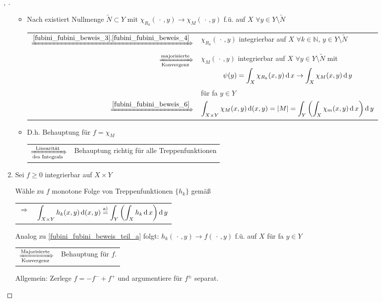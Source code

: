 \begin{proof}[, ]
\begin{enumerate}[label={\alph*)},topsep=\dimexpr-\baselineskip/2\relax]
\begin{itemize}
		\item Nach  existiert Nullmenge $\tilde{N}\subset Y$ mit $\chi_{R_k}(\,\cdot\, , y)\to \chi_M(\,\cdot \, , y)$ f.ü. auf $X$ $\forall y\in Y\setminus\tilde{N}$ \\
		\begin{tabularx}{\linewidth}{r@{\ \ }X}
		$\xRightarrow{\eqref{fubini_fubini_beweis_3},\eqref{fubini_fubini_beweis_4}}$ & $\chi_{R_k} (\,\cdot\, , y)$ integrierbar auf $X$ $\forall k\in \mathbb{N}$, $y\in Y\setminus\tilde{N}$ \\
		$\xRightarrow[\text{Konvergenz}]{\text{majorisierte}}$ & $\chi_M(\,\cdot\, ,y)$ integrierbar auf $X$ $\forall y\in Y\setminus\tilde{N}$ mit
		\[\psi(y) = \int_X \chi_{R_k}(x,y)\operatorname{d} x \to \int_X \chi_M (x,y) \operatorname{d} y\] für \gls{fa} $y\in Y$ \\
		$\xRightarrow{\eqref{fubini_fubini_beweis_6}}$&  $\displaystyle \int_{X\times Y} \chi_M (x,y) \operatorname{d} (x,y) = \vert M \vert = \int_Y \left( \int_X \chi_m (x,y) \operatorname{d} x\right) \operatorname{d} y$
		\end{tabularx}
		
		\item D.h. Behauptung für $f=\chi_M$ \\ \begin{tabularx}{\linewidth}{r@{\ \ }X}
		$\xRightarrow[\text{des Integrals}]{\text{Linearität}}$ & Behauptung richtig für alle Treppenfunktionen
		\end{tabularx}
		\end{itemize}
		\item Sei $f\ge 0$ integrierbar auf $X\times Y$
		
		Wähle zu $f$ monotone Folge von Treppenfunktionen $\{ h_k\}$ gemäß  \\ \begin{tabularx}{\linewidth}{r@{\ \ }X}
		$\Rightarrow$ & $\displaystyle \int_{X\times Y} h_k(x,y) \operatorname{d} (x,y) \overset{\text{a)}}{=} \int_Y \left( \int_X h_k \operatorname{d} x\right) \operatorname{d} y$
		\end{tabularx}
		
		Analog zu \ref{fubini_fubini_beweis_teil_a} folgt: $h_k(\,\cdot\, , y)\to f(\,\cdot\,,y)$ f.ü. auf $X$ für \gls{fa} $y\in Y$ \\ \begin{tabularx}{\linewidth}{r@{\ \ }X}
		$\xRightarrow[\text{Konvergenz}]{\text{Majorisierte}}$ & Behauptung für $f$.
		\end{tabularx}
		
		Allgemein: Zerlege $f = -f^- + f^+$ und argumentiere für $f^\pm$ separat.
	\end{enumerate}
\end{proof}

